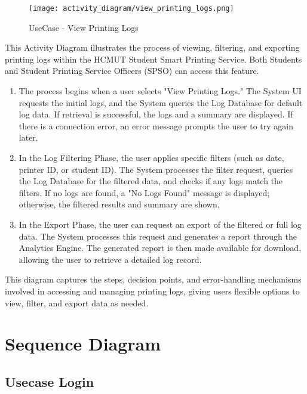 \documentclass[a4paper]{report}
\begin{document}
\begin{figure}[H]
    \centering
    \texttt{[image: activity\_diagram/view\_printing\_logs.png]}
    \caption{UseCase - View Printing Logs}
\end{figure}
This Activity Diagram illustrates the process of viewing, filtering, and exporting printing logs within the HCMUT Student Smart Printing Service. Both Students and Student Printing Service Officers (SPSO) can access this feature.
\begin{enumerate}
    \item The process begins when a user selects "View Printing Logs." The System UI requests the initial logs, and the System queries the Log Database for default log data. If retrieval is successful, the logs and a summary are displayed. If there is a connection error, an error message prompts the user to try again later.
    \item In the Log Filtering Phase, the user applies specific filters (such as date, printer ID, or student ID). The System processes the filter request, queries the Log Database for the filtered data, and checks if any logs match the filters. If no logs are found, a "No Logs Found" message is displayed; otherwise, the filtered results and summary are shown.
    \item In the Export Phase, the user can request an export of the filtered or full log data. The System processes this request and generates a report through the Analytics Engine. The generated report is then made available for download, allowing the user to retrieve a detailed log record.
\end{enumerate}
This diagram captures the steps, decision points, and error-handling mechanisms involved in accessing and managing printing logs, giving users flexible options to view, filter, and export data as needed.


\section{Sequence Diagram}

\subsection{Usecase Login}

\vspace{1cm}
\end{document}
